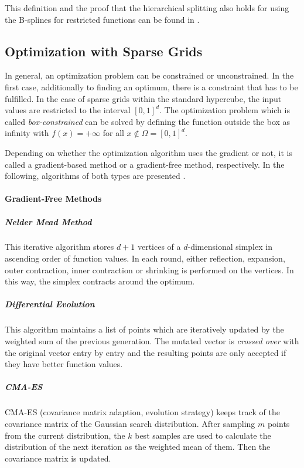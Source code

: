 This definition and the proof that the hierarchical splitting also holds for using the B-splines for restricted functions can be found in \cite{b_splines}.

\subsection{Optimization with Sparse Grids}\label{Optimization_algorithms}

In general, an optimization problem can be constrained or unconstrained. In the first case, additionally to finding an optimum, there is a constraint that has to be fulfilled. In the case of sparse grids within the standard hypercube, the input values are restricted to the interval $ [0,1]^d $. The optimization problem which is called \textit{box-constrained} can be solved by defining the function outside the box as infinity with $ f(x) = +\infty $ for all $ x \notin \Omega = [0,1]^d $. 

Depending on whether the optimization algorithm uses the gradient or not, it is called a gradient-based method or a gradient-free method, respectively. In the following, algorithms of both types are presented \cite{b_splines}.

\newpage
\paragraph{Gradient-Free Methods}

\subparagraph{Nelder Mead Method}
This iterative algorithm stores $ d+1 $ vertices of a $ d $-dimensional simplex in ascending order of function values. In each round, either reflection, expansion, outer contraction, inner contraction or shrinking is performed on the vertices. In this way, the simplex contracts around the optimum.

\subparagraph{Differential Evolution}
This algorithm maintains a list of points which are iteratively updated by the weighted sum of the previous generation. The mutated vector is \textit{crossed over} with the original vector entry by entry and the resulting points are only accepted if they have better function values. 

\subparagraph{CMA-ES}
CMA-ES (covariance matrix adaption, evolution strategy) keeps track of the covariance matrix of the Gaussian search distribution. After sampling $ m $ points from the current distribution, the $ k $ best samples are used to calculate the distribution of the next iteration as the weighted mean of them. Then the covariance matrix is updated.

